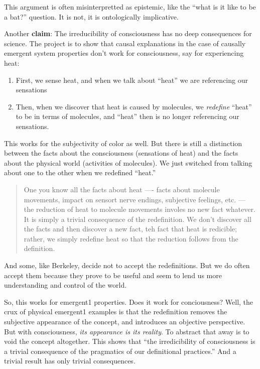 \documentclass{article}
\newcommand{\ti}[1]{\textit{#1}}
\newcommand{\tb}[1]{\textbf{#1}}
\begin{document}
This argument is often misinterpretted as epistemic, like the ``what is it like to be a bat?'' question. It is not, it is ontologically implicative.

Another \tb{claim}: The irreducibility of consciousness has no deep consequences for science. The project is to show that causal explanations in the case of causally emergent system properties don't work for consciousness, say for experiencing heat:
\begin{enumerate}
\item First, we sense heat, and when we talk about ``heat'' we are referencing our sensations
\item Then, when we discover that heat is caused by molecules, we \ti{redefine} ``heat'' to be in terms of molecules, and ``heat'' then is no longer referencing our sensations.
\end{enumerate}

This works for the subjectivity of color as well. But there is still a distinction between the facts about the consciousness (sensations of heat) and the facts about the physical world (activities of molecules). We just switched from talking about one to the other when we redefined ``heat.''

\begin{quote}
One you know all the facts about heat ---- facts about molecule movements, impact on sensort nerve endings, subjective feelings, etc. --- the reduction of heat to molecule movements involes no new fact whatever. It is simply a trivial consequence of the redefinition. We don't discover all the facts and then discover a new fact, teh fact that heat is redicible; rather, we simply redefine heat so that the reduction follows from the definition.
\end{quote}

And some, like Berkeley, decide not to accept the redefinitions. But we do often accept them because they prove to be useful and seem to lend us more understanding and control of the world. 

So, this works for emergent1 properties. Does it work for conciousness? Well, the crux of physical emergent1 examples is that the redefinition removes the subjective appearance of the concept, and introduces an objective perspective. But with consciousness, \ti{its appearance is its reality}. To abstract that away is to void the concept altogether. This shows that ``the irredicibility of consciousness is a trivial consequence of the pragmatics of our definitional practices.'' And a trivial result has only trivial consequences.
\end{document}
